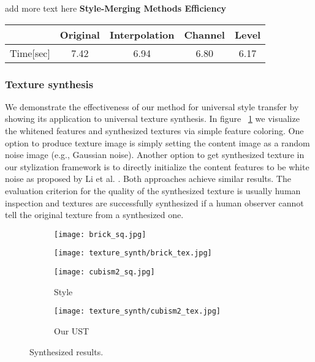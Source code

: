 add more text here\newline
\textbf{Style-Merging Methods Efficiency}
\begin{center}
	\begin{tabular}{||c| |c| |c| |c| |c||} 
		\hline
		\space & Original & Interpolation & Channel & Level \\ [0.5ex] 
		\hline\hline
		Time[sec] & 7.42 & 6.94 & 6.80 & 6.17\\ 
		\hline
	\end{tabular}
\end{center}

\subsubsection{Texture synthesis}
We demonstrate the effectiveness of our method for universal style transfer by showing its application to universal texture synthesis. In figure ~\ref{fig:texture} we visualize the whitened features and
synthesized textures via simple feature coloring.
One option to produce texture image is simply setting the content image as a random noise image (e.g., Gaussian noise). Another option to get synthesized texture in our stylization framework is to directly initialize the content features to be white noise as proposed by Li et al. \cite{bib11}. Both approaches achieve similar results.
The evaluation criterion for the quality of the synthesized texture is usually human inspection and textures are successfully synthesized if a human observer cannot tell the original texture from a synthesized one.
\begin{figure}[H]
	\centering
	\begin{subfigure}[b]{0.4\linewidth}
		\texttt{[image: brick\_sq.jpg]} %
	\end{subfigure}
	\begin{subfigure}[b]{0.4\linewidth}
		\texttt{[image: texture\_synth/brick\_tex.jpg]} %
	\end{subfigure}
	\centering
	\begin{subfigure}[b]{0.4\linewidth}
		\texttt{[image: cubism2\_sq.jpg]} %
		\caption{Style}
	\end{subfigure}
	\begin{subfigure}[b]{0.4\linewidth}
		\texttt{[image: texture\_synth/cubism2\_tex.jpg]} %
		\caption{Our UST}
	\end{subfigure}
	\caption{Synthesized results.}
	\label{fig:texture}
\end{figure}